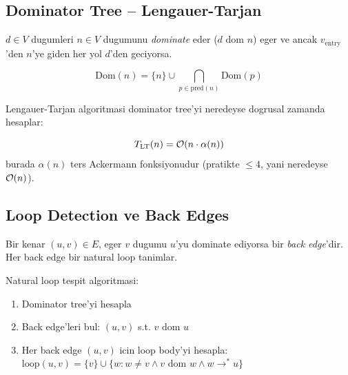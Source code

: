 \subsection{Dominator Tree -- Lengauer-Tarjan}

\begin{tanim}[Dominator]
$d \in V$ dugumleri $n \in V$ dugumunu \emph{dominate} eder ($d \text{ dom } n$)
eger ve ancak $v_{\text{entry}}$'den $n$'ye giden her yol $d$'den geciyorsa.
\end{tanim}

\begin{equation}
  \text{Dom}(n) = \{n\} \cup \bigcap_{p \in \text{pred}(n)} \text{Dom}(p)
  \label{eq:dominator-set}
\end{equation}

Lengauer-Tarjan algoritmasi dominator tree'yi neredeyse dogrusal zamanda hesaplar:

\begin{equation}
  T_{\text{LT}}(n) = \mathcal{O}\!\left(n \cdot \alpha(n)\right)
  \label{eq:lengauer-tarjan}
\end{equation}
burada $\alpha(n)$ ters Ackermann fonksiyonudur (pratikte $\leq 4$, yani
neredeyse $\mathcal{O}\!\left(n\right)$).

\subsection{Loop Detection ve Back Edges}

\begin{tanim}
Bir kenar $(u, v) \in E$, eger $v$ dugumu $u$'yu dominate ediyorsa
bir \emph{back edge}'dir. Her back edge bir natural loop tanimlar.
\end{tanim}

Natural loop tespit algoritmasi:
\begin{enumerate}
  \item Dominator tree'yi hesapla
  \item Back edge'leri bul: $(u, v)$ s.t. $v \text{ dom } u$
  \item Her back edge $(u, v)$ icin loop body'yi hesapla:
        $\text{loop}(u, v) = \{v\} \cup \{w : w \neq v \wedge v \text{ dom } w \wedge w \to^* u\}$
\end{enumerate}

